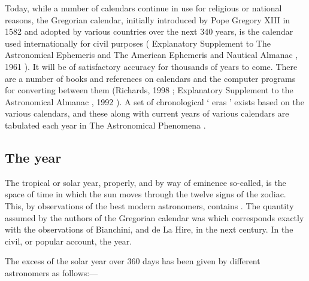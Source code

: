 Today, while a number of calendars continue in use for religious or national
reasons, the Gregorian calendar, initially introduced by Pope Gregory XIII in 1582
and adopted by various countries over the next 340 years, is the calendar used
internationally for civil purposes ( Explanatory Supplement to The Astronomical
Ephemeris and The American Ephemeris and Nautical Almanac , 1961 ). It will be of
satisfactory accuracy for thousands of years to come. There are a number of books
and references on calendars and the computer programs for converting between
them (Richards, 1998 ; Explanatory Supplement to the Astronomical Almanac , 1992 ).
A set of chronological ‘ eras ’ exists based on the various calendars, and these along
with current years of various calendars are tabulated each year in The Astronomical
Phenomena .

\subsection{The year}

The tropical or solar year, properly, and by way of eminence so-called, is the space of time in which the sun moves 
through the twelve signs of the zodiac. This, by observations of the best modern astronomers, contains . The quantity assumed by the authors of the Gregorian calendar was  which  corresponds exactly with the observations of Bianchini, and  de La Hire, in the next century. In the civil, or popular account, the year. 

The excess of the solar year over 360 days has been given by different astronomers as follows:---
 
\def\daytime#1#2#3#4{%
 #1\textsuperscript{d}%
 #2\textsuperscript{h}%
 #3\textsuperscript{m}%
 #4\textsuperscript{s}%
  }
 

